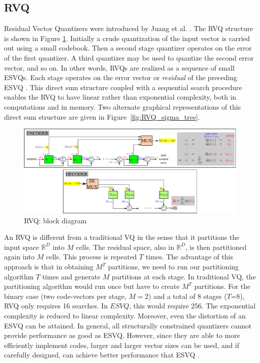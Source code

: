 \subsection{RVQ}
Residual Vector Quantizers were introduced by Juang et al. \cite{1982_CNF_SpeechRVQ_JuangGray}.  The RVQ structure is shown in Figure \ref{fig:RVQ_block_diagram}.  Initially a crude quantization of the input vector is carried out using a small codebook.  Then a second stage quantizer operates on the error of the first quantizer.  A third quantizer may be used to quantize the second error vector, and so on.  In other words, RVQs are realized as a sequence of small ESVQs.  Each stage operates on the error vector or \emph{residual} of the preceding ESVQ \cite{1991_CNF_DesignPerformanceRVQ_Frost}.  This direct sum structure coupled with a sequential search procedure enables the RVQ to have linear rather than exponential complexity, both in computations and in memory.  Two alternate graphical representations of this direct sum structure are given in Figure~\ref{fig:RVQ_sigma_tree}.

\begin{figure}				
	\includegraphics[width=1\textwidth]{thesis/RVQ_blockDiagram.pdf}
	\caption{RVQ: block diagram}
	\label{fig:RVQ_block_diagram}
\end{figure}

An RVQ is different from a traditional VQ in the sense that it partitions the input space $\mathbb{R}^D$ into $M$ cells.  The residual space, also in $\mathbb{R}^D$, is then partitioned again into $M$ cells.  This process is repeated $T$ times.  The advantage of this approach is that in obtaining $M^T$ partitions, we need to run our partitioning algorithm $T$ times and generate $M$ partitions at each stage.  In traditional VQ, the partitioning algorithm would run once but have to create $M^T$ partitions.  For the binary case (two code-vectors per stage, $M=2$) and a total of 8 stages ($T$=8), RVQ only requires 16 searches.  In $ESVQ$, this would require 256.  The exponential complexity is reduced to linear complexity.  Moreover, even the distortion of an ESVQ can be attained.  In general, all structurally constrained quantizers cannot provide performance as good as ESVQ.  However, since they are able to more efficiently implement codes, larger and larger vector sizes can be used, and if carefully designed, can achieve better performance that ESVQ \cite{1996_JNL_AdvancesRVQ_Barnes}.

